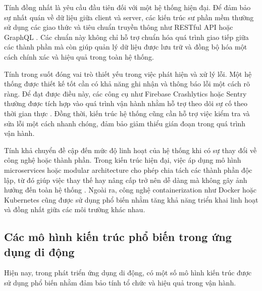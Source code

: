     \begin{flushleft}
        \hspace*{0.8cm}Tính đồng nhất là yêu cầu đầu tiên đối với một hệ thống hiện đại. Để đảm bảo sự nhất quán về dữ liệu giữa client và server, các kiến trúc sư phần mềm thường sử dụng các giao thức và tiêu chuẩn truyền thông như RESTful API hoặc GraphQL \cite{restgraphql}. Các chuẩn này không chỉ hỗ trợ chuẩn hóa quá trình giao tiếp giữa các thành phần mà còn giúp quản lý dữ liệu được lưu trữ và đồng bộ hóa một cách chính xác và hiệu quả trong toàn hệ thống.
      \end{flushleft}

      \begin{flushleft}
        \hspace*{0.8cm}Tính trong suốt đóng vai trò thiết yếu trong việc phát hiện và xử lý lỗi. Một hệ thống được thiết kế tốt cần có khả năng ghi nhận và thông báo lỗi một cách rõ ràng. Để đạt được điều này, các công cụ như Firebase Crashlytics hoặc Sentry thường được tích hợp vào quá trình vận hành nhằm hỗ trợ theo dõi sự cố theo thời gian thực \cite{firebasecrashlytics}. Đồng thời, kiến trúc hệ thống cũng cần hỗ trợ việc kiểm tra và sửa lỗi một cách nhanh chóng, đảm bảo giảm thiểu gián đoạn trong quá trình vận hành.
      \end{flushleft}

      \begin{flushleft}
        \hspace*{0.8cm}Tính khả chuyển đề cập đến mức độ linh hoạt của hệ thống khi có sự thay đổi về công nghệ hoặc thành phần. Trong kiến trúc hiện đại, việc áp dụng mô hình microservices hoặc modular architecture cho phép chia tách các thành phần độc lập, từ đó giúp việc thay thế hay nâng cấp trở nên dễ dàng mà không gây ảnh hưởng đến toàn hệ thống \cite{microservices}. Ngoài ra, công nghệ containerization như Docker hoặc Kubernetes cũng được sử dụng phổ biến nhằm tăng khả năng triển khai linh hoạt và đồng nhất giữa các môi trường khác nhau.
      \end{flushleft}

    \subsection{Các mô hình kiến trúc phổ biến trong ứng dụng di động}
    \renewcommand{\labelitemi}{--}
    \begin{flushleft}
        \hspace*{0.8cm}Hiện nay, trong phát triển ứng dụng di động, có một số mô hình kiến trúc được sử dụng phổ biến nhằm đảm bảo tính tổ chức và hiệu quả trong vận hành.
    \end{flushleft}

